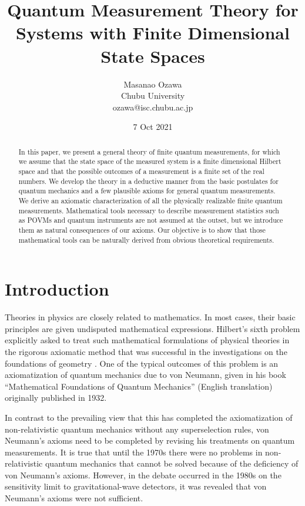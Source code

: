 \documentclass[12pt]{article}
\begin{document}
\date{7 Oct 2021}
\title{Quantum Measurement Theory for Systems with Finite Dimensional State Spaces}
\author{Masanao Ozawa \\ Chubu University  \\ {ozawa@isc.chubu.ac.jp}}

\maketitle
\begin{abstract}In this paper, we present a general theory of finite quantum measurements,
for which we assume that the state space of the measured system is a finite dimensional Hilbert space
and that the possible outcomes of a measurement is a finite set of the real numbers.
We develop the theory in a deductive manner from the basic postulates for quantum 
mechanics and a few plausible axioms for general quantum measurements.
We derive an axiomatic characterization of all the physically realizable
finite quantum measurements. 
Mathematical tools necessary to describe measurement statistics such as POVMs 
and quantum instruments are not assumed at the outset, but we introduce
them as natural consequences of our axioms.  Our objective is to show that those
mathematical tools can be naturally derived from obvious theoretical requirements.
\end{abstract}

\newpage

\section{Introduction}

Theories in physics are closely related to mathematics.
In most cases, their basic principles are given undisputed 
mathematical expressions.
Hilbert's sixth problem explicitly asked to treat such mathematical
formulations of physical theories in the rigorous axiomatic method
that was successful in the investigations on the foundations of geometry
\cite{Hil03}.
One of the typical outcomes of this problem is an axiomatization of 
quantum mechanics due to von Neumann, given in his
book ``Mathematical Foundations of Quantum Mechanics''  (English translation) \cite{vN32E}
originally published in 1932.

In contrast to the prevailing view that this has completed 
the axiomatization of non-relativistic quantum mechanics without
any superselection rules, von Neumann's axioms need to be
completed by revising his treatments on quantum measurements.
It is true that until the 1970s there were no problems in non-relativistic
quantum mechanics that cannot be solved because of the deficiency 
of von Neumann's axioms.
However, in the debate occurred in the 1980s on the sensitivity limit 
to gravitational-wave detectors, it was revealed that 
von Neumann's axioms were not sufficient.
\end{document}
